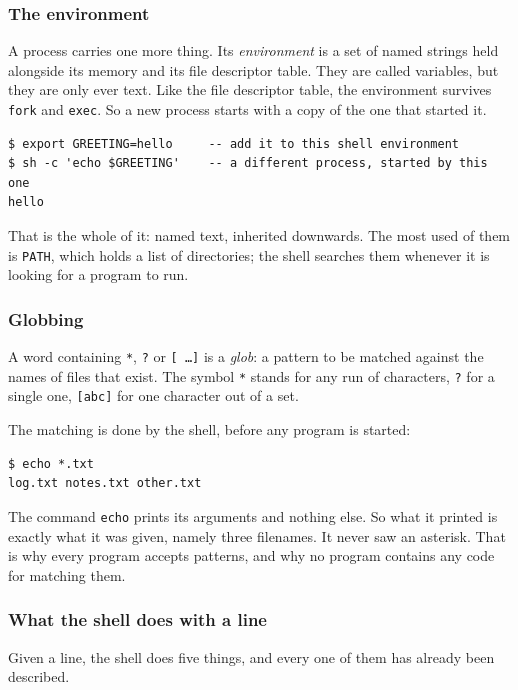 \documentclass[11pt,a4paper]{article}
\begin{document}
\subsubsection{The environment}

A process carries one more thing. Its \emph{environment} is a set of named strings held
alongside its memory and its file descriptor table. They are called variables, but they are only ever
text. Like the file descriptor table, the environment survives \texttt{fork} and \texttt{exec}. So a new
process starts with a copy of the one that started it.

\begin{lstlisting}[language=SH]
$ export GREETING=hello     -- add it to this shell environment
$ sh -c 'echo $GREETING'    -- a different process, started by this one
hello
\end{lstlisting}

That is the whole of it: named text, inherited downwards. The most used of them is
\texttt{PATH}, which holds a list of directories; the shell searches them whenever it is
looking for a program to run.

\subsubsection{Globbing}

A word containing \texttt{*}, \texttt{?} or \texttt{[\,\ldots]} is a \emph{glob}: a pattern to
be matched against the names of files that exist. The symbol \texttt{*} stands for any run of characters,
\texttt{?} for a single one, \texttt{[abc]} for one character out of a set.

The matching is done by the shell, before any program is started:

\begin{lstlisting}[language=SH]
$ echo *.txt
log.txt notes.txt other.txt
\end{lstlisting}

The command \texttt{echo} prints its arguments and nothing else. So what it printed is exactly what it was
given, namely three filenames. It never saw an asterisk. That is why every program accepts
patterns, and why no program contains any code for matching them.

\subsubsection{What the shell does with a line}

Given a line, the shell does five things, and every one of them has already been described.
\end{document}
